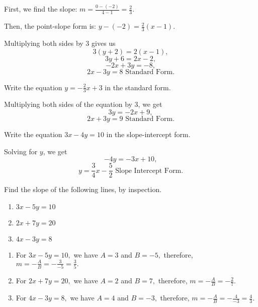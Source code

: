 \begin{solution}
First, we find the slope: $m = \frac{0 - (-2)}{4 - 1} = \frac{2}{3}.$

Then, the point-slope form is: $y - (-2) = \frac{2}{3}(x - 1).$

Multiplying both sides by 3 gives us
\[3(y + 2) = 2(x - 1),\]
\[3y + 6 = 2x - 2,\]
\[-2x + 3y = -8,\]
\[2x - 3y = 8 \text{ Standard Form}.\]
\end{solution}


\begin{example}
Write the equation $y = -\frac{2}{3}x + 3$ in the standard form.
\end{example}

\begin{solution}
Multiplying both sides of the equation by 3, we get
\[3y = -2x + 9,\]
\[2x + 3y = 9 \text{ Standard Form}.\]
\end{solution}


\begin{example}
Write the equation $3x - 4y = 10$ in the slope-intercept form.
\end{example}

\begin{solution}
Solving for $y$, we get
\[-4y = -3x + 10,\]
\[y = \frac{3}{4}x - \frac{5}{2} \text{ Slope Intercept Form}.\]
\end{solution}

\begin{example}
Find the slope of the following lines, by inspection.
\begin{enumerate}
    \item $3x - 5y = 10$
    \item $2x + 7y = 20$
    \item $4x - 3y = 8$
\end{enumerate}
\end{example}

\begin{solution}
\begin{enumerate}
    \item For $3x - 5y = 10,$ we have $A = 3$ and $B = -5,$ therefore, $m = -\frac{A}{B} = -\frac{3}{-5} = \frac{3}{5}.$
    
    \item For $2x + 7y = 20,$ we have $A = 2$ and $B = 7,$ therefore, $m = -\frac{A}{B} = -\frac{2}{7}.$
    
    \item For $4x - 3y = 8,$ we have $A = 4$ and $B = -3,$ therefore, $m = -\frac{A}{B} = -\frac{4}{-3} = \frac{4}{3}.$
\end{enumerate}
\end{solution}


